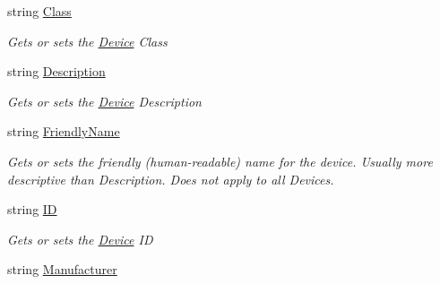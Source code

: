\begin{DoxyCompactItemize}
\item 
string \hyperlink{class_microsoft_1_1_tools_1_1_windows_device_portal_1_1_device_portal_1_1_device_a62766ef1cb0a94d5067fc77b64138b34}{Class}
\begin{DoxyCompactList}\small\item\em Gets or sets the \hyperlink{class_microsoft_1_1_tools_1_1_windows_device_portal_1_1_device_portal_1_1_device}{Device} Class \end{DoxyCompactList}\item 
string \hyperlink{class_microsoft_1_1_tools_1_1_windows_device_portal_1_1_device_portal_1_1_device_addc8d55d1c5fbc9f64526815b30aa9fb}{Description}
\begin{DoxyCompactList}\small\item\em Gets or sets the \hyperlink{class_microsoft_1_1_tools_1_1_windows_device_portal_1_1_device_portal_1_1_device}{Device} Description \end{DoxyCompactList}\item 
string \hyperlink{class_microsoft_1_1_tools_1_1_windows_device_portal_1_1_device_portal_1_1_device_ae01a12018cdb342f194fe6279a30b915}{Friendly\+Name}
\begin{DoxyCompactList}\small\item\em Gets or sets the friendly (human-\/readable) name for the device. Usually more descriptive than Description. Does not apply to all Devices. \end{DoxyCompactList}\item 
string \hyperlink{class_microsoft_1_1_tools_1_1_windows_device_portal_1_1_device_portal_1_1_device_a71a738dd2f311bfa6e4c1de9f1026977}{ID}
\begin{DoxyCompactList}\small\item\em Gets or sets the \hyperlink{class_microsoft_1_1_tools_1_1_windows_device_portal_1_1_device_portal_1_1_device}{Device} ID \end{DoxyCompactList}\item 
string \hyperlink{class_microsoft_1_1_tools_1_1_windows_device_portal_1_1_device_portal_1_1_device_a1d15a5277f5e286e269c46d3ff3e39e6}{Manufacturer}

\end{DoxyCompactItemize}
